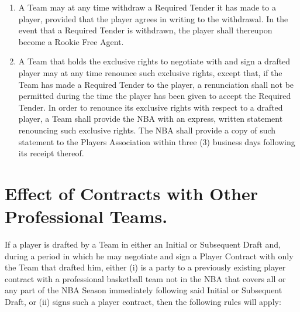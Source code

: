 \documentclass[
]{book}
\begin{document}
\begin{enumerate}
\item
  A Team may at any time withdraw a Required Tender it has made to a player, provided that the player agrees in writing to the withdrawal. In the event that a Required Tender is withdrawn, the player shall thereupon become a Rookie Free Agent.
\item
  A Team that holds the exclusive rights to negotiate with and sign a drafted player may at any time renounce such exclusive rights, except that, if the Team has made a Required Tender to the player, a renunciation shall not be permitted during the time the player has been given to accept the Required Tender. In order to renounce its exclusive rights with respect to a drafted player, a Team shall provide the NBA with an express, written statement renouncing such exclusive rights. The NBA shall provide a copy of such statement to the Players Association within three (3) business days following its receipt thereof.
\end{enumerate}

\hypertarget{effect-of-contracts-with-other-professional-teams.}{%
\section{Effect of Contracts with Other Professional Teams.}\label{effect-of-contracts-with-other-professional-teams.}}

If a player is drafted by a Team in either an Initial or Subsequent Draft and, during a period in which he may negotiate and sign a Player Contract with only the Team that drafted him, either (i) is a party to a previously existing player contract with a professional basketball team not in the NBA that covers all or any part of the NBA Season immediately following said Initial or Subsequent Draft, or (ii) signs such a player contract, then the following rules will apply:
\end{document}
